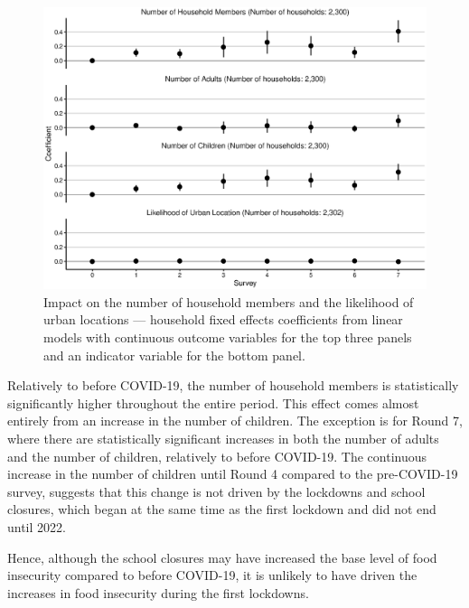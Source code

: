 \documentclass{wber}
\begin{document}
\begin{figure}
\caption{Impact on the number of household members and the likelihood of
urban locations --- household fixed effects coefficients from linear
models with continuous outcome variables for the top three panels and an
indicator variable for the bottom panel.}\label{fig:members_location}
\begin{center}
\includegraphics[width=\linewidth, keepaspectratio]{./eps/fig_11.eps}
\end{center}
\end{figure}

Relatively to before COVID-19, the number of household members is
statistically significantly higher throughout the entire period. This
effect comes almost entirely from an increase in the number of children.
The exception is for Round 7, where there are statistically significant
increases in both the number of adults and the number of children,
relatively to before COVID-19. The continuous increase in the number of
children until Round 4 compared to the pre-COVID-19 survey, suggests
that this change is not driven by the lockdowns and school closures,
which began at the same time as the first lockdown and did not end until
2022.

Hence, although the school closures may have increased the base level of
food insecurity compared to before COVID-19, it is unlikely to have
driven the increases in food insecurity during the first lockdowns.
\end{document}
